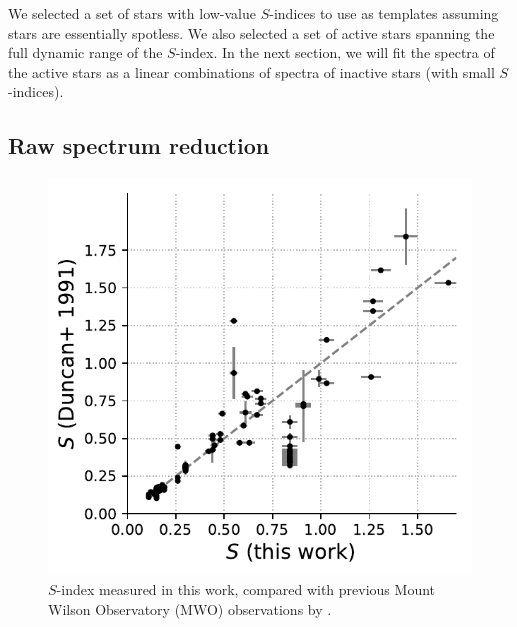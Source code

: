 We selected a set of stars with low-value $S$-indices to use as templates assuming stars are essentially spotless. We also selected a set of active stars spanning the full dynamic range of the $S$-index. In the next section, we will fit the spectra of the active stars as a linear combinations of spectra of inactive stars (with small $S$-indices).

\subsection{Raw spectrum reduction} 

\begin{figure}
    \centering
    \includegraphics[scale=0.85]{freckles/sind_correlation.pdf}
    \caption{$S$-index measured in this work, compared with previous Mount Wilson Observatory (MWO) observations by \citet{Duncan1991}.}
    \label{fig:sind_correlation}
\end{figure}


